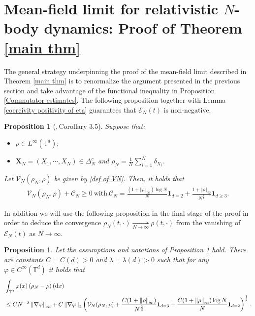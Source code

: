 \documentclass[11pt,reqno]{amsart}
\newtheorem{prop}[thm]{Proposition}
\numberwithin{equation}{section}
\def\dd{{\rm d}}
\begin{document}
\section{Mean-field limit for relativistic $N$-body dynamics: Proof of Theorem \ref{main thm}}\label{Mean field limit section}
The general strategy underpinning the proof of the mean-field limit described in Theorem \ref{main thm} is to renormalize the argument presented in the previous section and take advantage of the functional inequality in Proposition \ref{Commutator estimates}. The following proposition together with Lemma \eqref{coercivity positivity of eta} guarantees that $\mathcal{E}_{N}(t)$ is non-negative.  
\begin{prop}[\cite{duerinckx2020mean},\,Corollary 3.5]
Suppose that: 
\begin{itemize}
\item[{\rm(i)}]$\rho \in L^{\infty}(\mathbb{T}^{d});$ 
   \item[{\rm(ii)}]
   $\mathbf{X}_{N}=(X_{1},\cdots\!,X_{N})\in \Delta_{N}^{c}$ and $\rho_{N}=\frac{1}{N}\sum_{i=1}^{N}\delta_{X_{i}}$. 
\end{itemize}
Let $\mathcal{V}_{N}(\rho_{N},\rho)$ be given by \eqref{def of VN}. Then, it holds that 
\begin{align*}
\mathcal{V}_{N}(\rho_{N},\rho) +\mathcal{C}_{N}\geq 0 \ \mbox{with}\ \mathcal{C}_{N}=\frac{(1+\left\Vert \rho\right\Vert_{\infty})\log N}{N}\mathbf{1}_{d=2}+\frac{1+\left\Vert \rho\right\Vert_{\infty} }{N^{\frac{2}{d}}}\mathbf{1}_{d\geq 3}. 
\end{align*} 
\label{non negativity}
\end{prop}
In addition we will use the following proposition in the final stage of the proof in order to deduce the convergence $\rho_{N}(t,\cdot)\underset{N\rightarrow \infty}{\rightharpoonup}\rho(t,\cdot)$ from the vanishing of $\mathcal{E}_{N}(t)$ as $N\rightarrow \infty$. 
\begin{prop}
\textup{\cite[Proposition 3.6]{duerinckx2020mean}}
Let the assumptions and notations of Proposition \ref{non negativity} hold. 
There are constants $C=C(d)>0$ and $\lambda=\lambda(d)>0$ such that for any $\varphi\in C^{\infty}(\mathbb{T}^{d})$ it holds that 
 \begin{align*}
&\int_{\mathbb{T}^{d}}\varphi(x)\left(\rho_{N}-\rho\right)(\dd x)\\
&\leq CN^{-\lambda}\left\Vert \nabla \varphi\right\Vert_{\infty} +C\left\Vert \nabla\varphi\right\Vert_{2} \left(\mathcal{V}_{N}(\rho_{N},\rho)+\frac{C(1+\left\Vert \rho \right\Vert_{\infty})}{N^{\frac{2}{d}}}\mathbf{1}_{d=3}+\frac{C(1+\left\Vert\rho \right\Vert_{\infty})\log N}{N}\mathbf{1}_{d=2}\right)^\frac{1}{2}.
 \end{align*}
 \label{coercivity inequality}
\end{prop}
\end{document}
